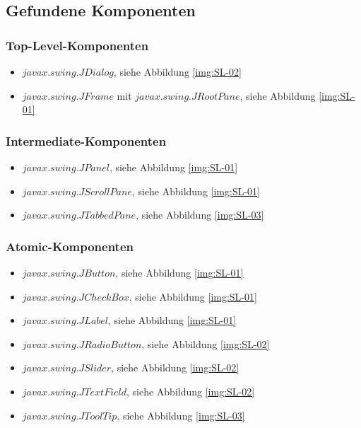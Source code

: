   \subsection{Gefundene Komponenten}
  
  \subsubsection{Top-Level-Komponenten}
  
  \begin{itemize}
    \item \(javax.swing.JDialog\), siehe Abbildung \ref{img:SL-02}
    \item \(javax.swing.JFrame\) mit \(javax.swing.JRootPane\), siehe Abbildung
    \ref{img:SL-01}
  \end{itemize}
  
  \subsubsection{Intermediate-Komponenten}
  
  \begin{itemize}
    \item \(javax.swing.JPanel\), siehe Abbildung \ref{img:SL-01}
    \item \(javax.swing.JScrollPane\), siehe Abbildung \ref{img:SL-01}
    \item \(javax.swing.JTabbedPane\), siehe Abbildung \ref{img:SL-03}
  \end{itemize}
  
  \subsubsection{Atomic-Komponenten}
  
  \begin{itemize}
    \item \(javax.swing.JButton\), siehe Abbildung \ref{img:SL-01}
    \item \(javax.swing.JCheckBox\), siehe Abbildung \ref{img:SL-01}
    \item \(javax.swing.JLabel\), siehe Abbildung \ref{img:SL-01}
    \item \(javax.swing.JRadioButton\), siehe Abbildung \ref{img:SL-02}
    \item \(javax.swing.JSlider\), siehe Abbildung \ref{img:SL-02}
    \item \(javax.swing.JTextField\), siehe Abbildung \ref{img:SL-02}
    \item \(javax.swing.JToolTip\), siehe Abbildung \ref{img:SL-03}
  \end{itemize}
  
